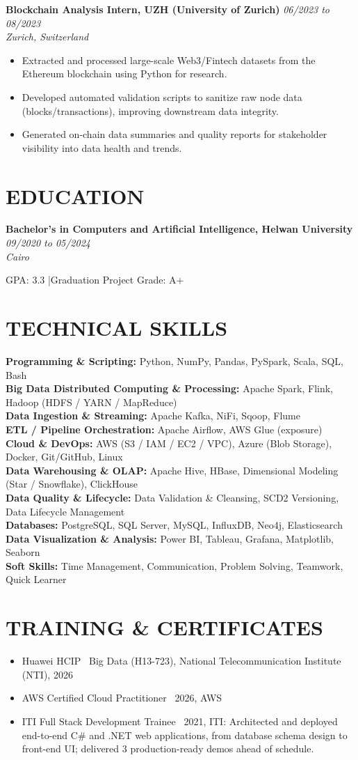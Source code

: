 \documentclass[10pt,letterpaper]{article}
\newcommand{\resumeItem}[1]{%
    \item\small{#1}
}
\newcommand{\resumeSubheading}[4]{%
    \vspace{2pt}
    \textbf{#1} \hfill \textit{\small #2}\\
    \textit{\small #3} \hfill \textit{\small #4}
    \vspace{1pt}
}
\newcommand{\resumeItemListStart}{\begin{itemize}}
\newcommand{\resumeItemListEnd}{\end{itemize}\vspace{2pt}}
\newcommand{\resumeSection}[1]{\section{\texorpdfstring{\MakeUppercase{#1}}{#1}}}
\begin{document}
\resumeSubheading
    {Blockchain Analysis Intern, UZH (University of Zurich)}
    {06/2023 to 08/2023}
    {}
    {Zurich, Switzerland}
\resumeItemListStart
    \resumeItem{Extracted and processed large-scale Web3/Fintech datasets from the Ethereum blockchain using Python for research.}
    \resumeItem{Developed automated validation scripts to sanitize raw node data (blocks/transactions), improving downstream data integrity.}
    \resumeItem{Generated on-chain data summaries and quality reports for stakeholder visibility into data health and trends.}
\resumeItemListEnd

\resumeSection{Education}
\resumeSubheading
    {Bachelor's in Computers and Artificial Intelligence, Helwan University}
    {09/2020 to 05/2024}
    {}
    {Cairo}
\vspace{2pt}\par
\small GPA: 3.3 \enspace|\enspace Graduation Project Grade: A+

\resumeSection{Technical Skills}
\small
\textbf{Programming \& Scripting:} Python, NumPy, Pandas, PySpark, Scala, SQL, Bash\\
\textbf{Big Data Distributed Computing \& Processing:} Apache Spark, Flink, Hadoop (HDFS / YARN / MapReduce)\\
\textbf{Data Ingestion \& Streaming:} Apache Kafka, NiFi, Sqoop, Flume\\
\textbf{ETL / Pipeline Orchestration:} Apache Airflow, AWS Glue (exposure)\\
\textbf{Cloud \& DevOps:} AWS (S3 / IAM / EC2 / VPC), Azure (Blob Storage), Docker, Git/GitHub, Linux\\
\textbf{Data Warehousing \& OLAP:} Apache Hive, HBase, Dimensional Modeling (Star / Snowflake), ClickHouse\\
\textbf{Data Quality \& Lifecycle:} Data Validation \& Cleansing, SCD2 Versioning, Data Lifecycle Management\\
\textbf{Databases:} PostgreSQL, SQL Server, MySQL, InfluxDB, Neo4j, Elasticsearch\\
\textbf{Data Visualization \& Analysis:} Power BI, Tableau, Grafana, Matplotlib, Seaborn\\
\textbf{Soft Skills:} Time Management, Communication, Problem Solving, Teamwork, Quick Learner

\resumeSection{Training \& Certificates}
\resumeItemListStart
    \resumeItem{Huawei HCIP \textbar\ Big Data (H13-723), National Telecommunication Institute (NTI), 2026}
    \resumeItem{AWS Certified Cloud Practitioner \textbar\ 2026, AWS}
    \resumeItem{ITI Full Stack Development Trainee \textbar\ 2021, ITI: Architected and deployed end-to-end C\# and .NET web applications, from database schema design to front-end UI; delivered 3 production-ready demos ahead of schedule.}
\resumeItemListEnd
\end{document}
